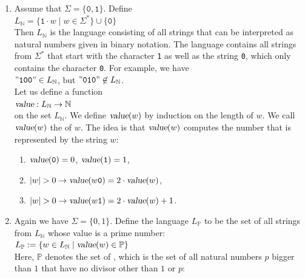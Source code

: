 \examplesEng
\begin{enumerate}
\item Assume that $\Sigma = \{\mathtt{0},\mathtt{1}\}$.  Define
\\[0.2cm]
\hspace*{1.3cm}
$L_\mathbb{N} = \{ \mathtt{1} \cdot w \mid w \in \Sigma^* \} \cup \{ \mathtt{0} \}$
\\[0.2cm]
Then $L_\mathbb{N}$ is the language consisting of all strings that can be interpreted as
natural numbers given in binary notation.  The language contains all strings from $\Sigma^*$  that start with
the character \texttt{1} as well as the string \texttt{0}, which only contains the character
\texttt{0}.  For example, we have
\\[0.2cm]
\hspace*{1.3cm}
$\mathtt{\symbol{34}100\symbol{34}} \in L_\mathbb{N}$, \quad but \quad $\mathtt{\symbol{34}010\symbol{34}}
\not\in L_\mathbb{N}$.
\\[0.2cm]
Let us define a function
\\[0.2cm]
\hspace*{1.3cm}
$\textsl{value}: L_\mathbb{N} \rightarrow \mathbb{N}$
\\[0.2cm]
on the set $L_\mathbb{N}$.  We define $\textsl{value}(w)$ by induction on the length of $w$.
We call $\textsl{value}(w)$ the  of $w$.  The idea is that
$\textsl{value}(w)$ computes the number that is represented by the string $w$:
\begin{enumerate}
\item $\textsl{value}(\mathtt{0}) = 0$, $\textsl{value}(\mathtt{1}) = 1$,
\item $|w| > 0 \rightarrow \textsl{value}(w\mathtt{0}) = 2 \cdot \textsl{value}(w)   $,
\item $|w| > 0 \rightarrow \textsl{value}(w\mathtt{1}) = 2 \cdot \textsl{value}(w) + 1$.
\end{enumerate}
\item Again we have $\Sigma = \{0,1\}$. Define the language $L_\mathbb{P}$
to be the set of all strings from $L_\mathbb{N}$ whose value is a prime number:
\\[0.2cm]
\hspace*{1.3cm}
$L_\mathbb{P} := \{ w \in L_\mathbb{N} \mid \textsl{value}(w) \in \mathbb{P} \}$
\\[0.2cm]
Here, $\mathbb{P}$ denotes the set of ,  which is the set of all natural
numbers $p$ bigger than $1$ that have no divisor other than $1$ or $p$:

\end{enumerate}
